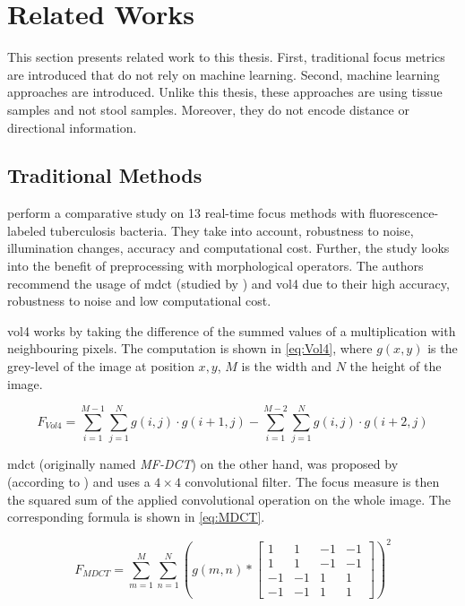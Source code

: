\section{Related Works}
\label{sec:Foundations:RelatedWorks}

This section presents related work to this thesis. First, traditional focus metrics are introduced that do not rely on machine learning. Second, machine learning approaches are introduced. Unlike this thesis, these approaches are using tissue samples and not stool samples. Moreover, they do not encode distance or directional information.

\subsection{Traditional Methods}
\label{sec:Foundations:RelatedWorks:Traditional}


\textcite{mateos-perez2012comparative} perform a comparative study on 13 real-time focus methods with fluorescence-labeled tuberculosis bacteria. They take into account, robustness to noise, illumination changes, accuracy and computational cost. Further, the study looks into the benefit of preprocessing with morphological operators.
The authors recommend the usage of \ac{mdct} (studied by \textcite{lee2008enhanced}) and \ac{vol4} \cite{vollath1988influence} due to their high accuracy, robustness to noise and low computational cost.

\ac{vol4} works by taking the difference of the summed values of a multiplication with neighbouring pixels. The computation is shown in \autoref{eq:Vol4}, where $g(x, y)$ is the grey-level of the image at position $x,y$, $M$ is the width and $N$ the height of the image.

\begin{equation}
    \label{eq:Vol4}
    F_{Vol4} = \sum_{i=1}^{M-1}\sum_{j=1}^{N} g(i,j) \cdot g(i+1, j) - \sum_{i=1}^{M-2}\sum_{j=1}^{N} g(i,j) \cdot g(i+2, j)
\end{equation}


\Ac{mdct} (originally named \emph{MF-DCT}) on the other hand, was proposed by \textcite{lee2008enhanced} (according to \textcite{redondo2012autofocus}) and uses a $4 \times 4$ convolutional filter. The focus measure is then the squared sum of the applied convolutional operation on the whole image. The corresponding formula is shown in \autoref{eq:MDCT}.

\begin{equation}
    \label{eq:MDCT}
    F_{MDCT}= \sum_{m=1}^{M}\sum_{n=1}^{N}
    ( g(m,n) *
    \begin{bmatrix}
        1 & 1 & -1 & -1 \\
        1 & 1 & -1 & -1 \\
        -1 & -1 & 1 & 1 \\
        -1 & -1 & 1 & 1
    \end{bmatrix}
    )^2
\end{equation}

